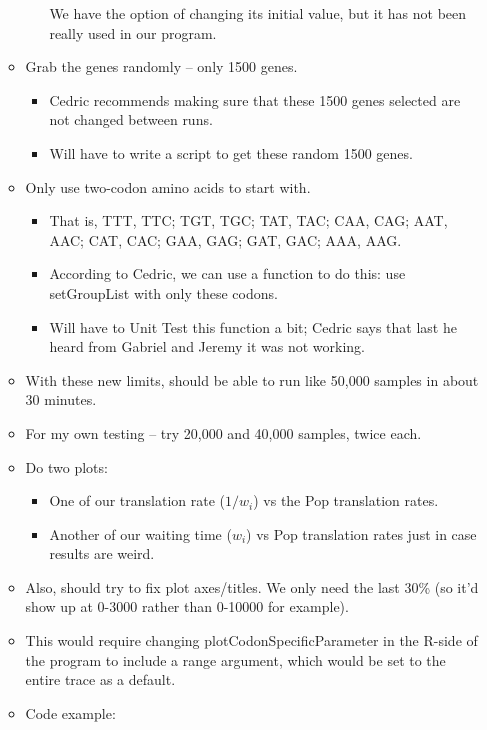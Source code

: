 \documentclass[12pt,hyperref]{labbook}
\newcommand{\sep}{\discretionary{}{}{}} %
\begin{document}
\begin{itemize}
\begin{itemize}
\begin{itemize}
            We have the option of changing its initial value, but it has not been really used in our program.
        \end{itemize}
        \item Grab the genes randomly -- only 1500 genes.
        \begin{itemize}
            \item Cedric recommends making sure that these 1500 genes selected are not changed between runs.
            \item Will have to write a script to get these random 1500 genes.
        \end{itemize}
        \item Only use two-codon amino acids to start with.
        \begin{itemize}
            \item That is, TTT, TTC; TGT, TGC; TAT, TAC; CAA, CAG; AAT, AAC; CAT, CAC; GAA, GAG; GAT, GAC; AAA, AAG.
            \item According to Cedric, we can use a function to do this: use setGroupList with only these codons.
            \item Will have to Unit Test this function a bit; Cedric says that last he heard from Gabriel and Jeremy it was not working.
        \end{itemize}
        \item With these new limits, should be able to run like 50,000 samples in about 30 minutes.
        \item For my own testing -- try 20,000 and 40,000 samples, twice each.
        \item Do two plots:
        \begin{itemize}
            \item One of our translation rate ($1 / w_i$) vs the Pop translation rates.
            \item Another of our waiting time ($w_i$) vs Pop translation rates just in case results are weird.
        \end{itemize}
        \item Also, should try to fix plot axes/titles. We only need the last 30\% (so it'd show up at 0-3000 rather than 0-10000 for example).
        \item This would require changing plot\sep Codon\sep Specific\sep Parameter in the R-side of the program to include a range argument, which would be set to the entire trace as a default.
        \item Code example:
        \begin{lstlisting}

\end{lstlisting}
\end{itemize}
\end{itemize}
\end{document}
